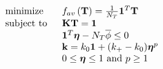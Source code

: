 \begin{equation}
	\begin{tabular}{ll}
		$\text{minimize}$  & $f_{av}\left({\mathbf{T}}\right)=\frac{1}{N_T}\mathbf{1}^T\mathbf{T}$                                                                                     \\
		\text{subject to } & $\mathbf{K}\mathbf{T}=\mathbf{1}$                                                                   \\
		& $\mathbf{1}^T\boldsymbol{\eta}-N_T\overline{\phi}\leq0$ \\
		& $\mathbf{k}=k_0\mathbf{1}+(k_+-k_0)\boldsymbol{\eta}^p$                                       \\
		& $0\leq\boldsymbol{\eta}\leq 1\text{ and } p\geq 1$
	\end{tabular}\label{Implementation-SIMP-Optimization-Problem}
\end{equation}
